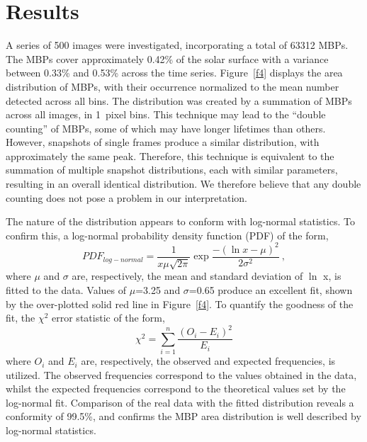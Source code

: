 \documentclass{emulateapj}
\begin{document}
\section{Results}
\label{results}
A series of 500 images were investigated, incorporating a total of 63312 MBPs.  The MBPs cover approximately 0.42\% of the solar surface with a variance between 0.33\% and 0.53\% across the time series. 
Figure~\ref{f4} displays the area distribution of MBPs, with their occurrence normalized to the mean number detected across all bins. The distribution was created by a summation of MBPs across all images, in 1~pixel bins.  This technique may lead to the ``double counting'' of MBPs, some of which may have longer lifetimes than others.  However, snapshots of single frames produce a similar distribution, with approximately the same peak.  Therefore, this technique is equivalent to the summation of multiple snapshot distributions, each with similar parameters, resulting in an overall identical distribution. We therefore believe that any double counting does not pose a problem in our interpretation.

The nature of the distribution appears to conform with log-normal statistics. To confirm this, a log-normal probability density function (PDF) of the form, 
\begin{equation}
PDF_{log-normal}=\frac{1}{x\mu\sqrt{2\pi}}\exp\frac{-(\ln x - \mu)^2}{2\sigma^2} \ ,
\end{equation} 
where $\mu$ and $\sigma$ are, respectively, the mean and standard deviation of $\ln$ x, is fitted to the data.  Values of $\mu$=3.25 and $\sigma$=0.65 produce an excellent fit, shown by the over-plotted solid red line in Figure~\ref{f4}.  To quantify the goodness of the fit, the $\chi^2$ error statistic \cite[]{Wal03} of the form,  
\begin{equation}
\chi^2 = \sum_{i=1}^{n} \frac{(O_i - E_i)^2}{E_i}
\end{equation}
where $O_{i}$ and $E_{i}$ are, respectively, the observed and expected frequencies, is utilized.  The observed frequencies correspond to the values obtained in the data, whilst the expected frequencies correspond to the theoretical values set by the log-normal fit.  
Comparison of the real data with the fitted distribution reveals a conformity of 99.5\%, and confirms the MBP area distribution is well described by  log-normal statistics.
\end{document}
